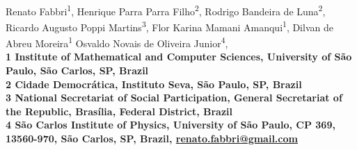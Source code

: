 \documentclass[10pt,letterpaper]{article}
\date{}
\begin{document}
\vspace*{0.35in}

\begin{flushleft}
{\Large
\textbf{}
}
\newline
\\
Renato Fabbri\textsuperscript{1},
Henrique Parra Parra Filho\textsuperscript{2},
Rodrigo Bandeira de Luna\textsuperscript{2},
Ricardo Augusto Poppi Martins\textsuperscript{3},
Flor Karina Mamani Amanqui\textsuperscript{1},
Dilvan de Abreu Moreira\textsuperscript{1}
Osvaldo Novais de Oliveira Junior\textsuperscript{4},
\\
\bigskip
\bf{1}  Institute of Mathematical and Computer Sciences, University of São Paulo, S\~ao Carlos, SP, Brazil
\\
\bf{2} Cidade Democrática, Instituto Seva, São Paulo, SP, Brazil
\\
\bf{3} National Secretariat of Social Participation, General Secretariat of the Republic, Brasília, Federal District, Brazil
\\
\bf{4} S\~ao Carlos Institute of Physics, University of São Paulo, CP 369, 13560-970, São Carlos, SP, Brazil, \url{renato.fabbri@gmail.com}
\bigskip

% 
%



%
%

\end{flushleft}
\end{document}
